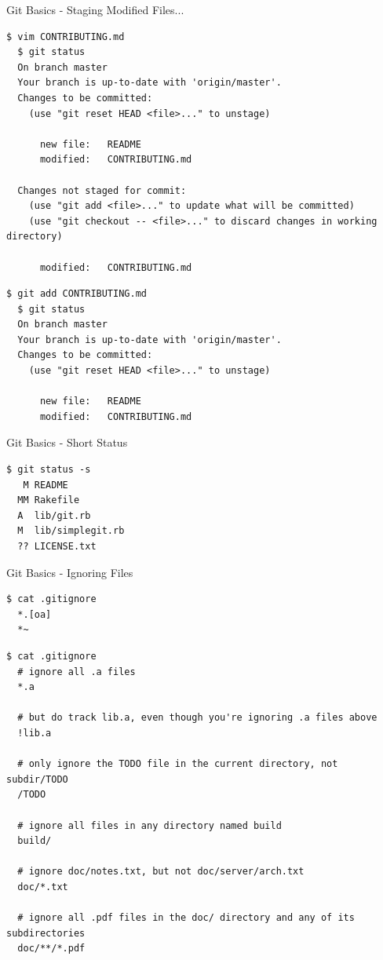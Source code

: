 \documentclass[sans,mathserif,aspectratio=169]{beamer}
\begin{document}
\begin{frame}[fragile]{Git Basics - Staging Modified Files...}
  \begin{lstlisting}[frame=single, backgroundcolor=\color{gray!20}, basicstyle=\tiny]
  $ vim CONTRIBUTING.md
  $ git status
  On branch master
  Your branch is up-to-date with 'origin/master'.
  Changes to be committed:
    (use "git reset HEAD <file>..." to unstage)

      new file:   README
      modified:   CONTRIBUTING.md

  Changes not staged for commit:
    (use "git add <file>..." to update what will be committed)
    (use "git checkout -- <file>..." to discard changes in working directory)

      modified:   CONTRIBUTING.md
  \end{lstlisting}
  \pause
  \begin{lstlisting}[frame=single, backgroundcolor=\color{gray!20}, basicstyle=\tiny]
  $ git add CONTRIBUTING.md
  $ git status
  On branch master
  Your branch is up-to-date with 'origin/master'.
  Changes to be committed:
    (use "git reset HEAD <file>..." to unstage)

      new file:   README
      modified:   CONTRIBUTING.md
  \end{lstlisting}
\end{frame}

\begin{frame}[fragile]{Git Basics - Short Status}
  \begin{lstlisting}[frame=single, backgroundcolor=\color{gray!20}, basicstyle=\tiny]
  $ git status -s
   M README
  MM Rakefile
  A  lib/git.rb
  M  lib/simplegit.rb
  ?? LICENSE.txt
  \end{lstlisting}
\end{frame}

\begin{frame}[fragile]{Git Basics - Ignoring Files}
  \begin{lstlisting}[frame=single, backgroundcolor=\color{gray!20}, basicstyle=\tiny]
  $ cat .gitignore
  *.[oa]
  *~
  \end{lstlisting}
  \pause
  \begin{lstlisting}[frame=single, backgroundcolor=\color{gray!20}, basicstyle=\tiny]
  $ cat .gitignore
  # ignore all .a files
  *.a

  # but do track lib.a, even though you're ignoring .a files above
  !lib.a

  # only ignore the TODO file in the current directory, not subdir/TODO
  /TODO

  # ignore all files in any directory named build
  build/

  # ignore doc/notes.txt, but not doc/server/arch.txt
  doc/*.txt

  # ignore all .pdf files in the doc/ directory and any of its subdirectories
  doc/**/*.pdf
  \end{lstlisting}
\end{frame}
\end{document}
